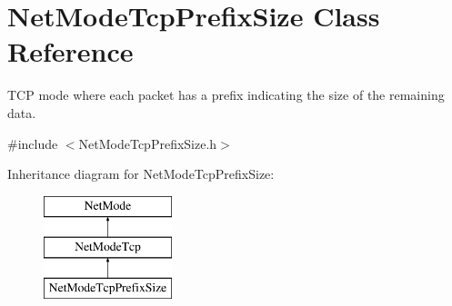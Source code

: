 \hypertarget{class_net_mode_tcp_prefix_size}{
\section{NetModeTcpPrefixSize Class Reference}
\label{class_net_mode_tcp_prefix_size}
}


TCP mode where each packet has a prefix indicating the size of the remaining data.  




{\ttfamily \#include $<$NetModeTcpPrefixSize.h$>$}

Inheritance diagram for NetModeTcpPrefixSize:\begin{figure}[H]
\begin{center}
\leavevmode
\includegraphics[height=3.000000cm]{class_net_mode_tcp_prefix_size}
\end{center}
\end{figure}
